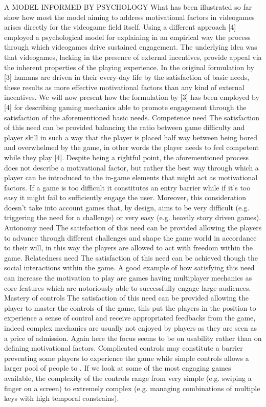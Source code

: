 A MODEL INFORMED BY PSYCHOLOGY
What has been illustrated so far show how most the model aiming to address motivational factors in videogames arises directly for the videogame field itself. Using a different approach [4] employed a psychological model for explaining in an empirical way the process through which videogames drive sustained engagement. The underlying idea was that videogames, lacking in the presence of external incentives, provide appeal via the inherent properties of the playing experience. In the original formulation by [3] humans are driven in their every-day life by the satisfaction of basic needs, these results as more effective motivational factors than any kind of  external incentives. We will now present how the formulation by [3] has been employed by [4] for describing gaming mechanics able to promote engagement through the satisfaction of the aforementioned basic needs.
Competence need 
The satisfaction of this need can be provided balancing the ratio between game difficulty and player skill in such a way that the player is placed half way between being bored and overwhelmed by the game, in other words the player needs to feel competent while they play [4]. Despite being a rightful point, the aforementioned process does not describe a motivational factor, but rather the best way through which a player can be introduced to the in-game elements that might act as motivational factors. If a game is too difficult it constitutes an entry barrier while if it’s too easy it might fail to sufficiently engage the user. Moreover, this consideration doesn’t take into account games that, by design, aims to be very difficult (e.g. triggering the need for a challenge) or very easy (e.g. heavily story driven games).
Autonomy need 	
The satisfaction of this need can be provided allowing the players to advance through different challenges and shape the game world in accordance to their will, in this way the players are allowed to act with freedom within the game.
Relatedness need 
The satisfaction of this need can be achieved though the social interactions within the game. A good example of how satisfying this need can increase the motivation to play are games having multiplayer mechanics as core features which are notoriously able to successfully engage large audiences. 
Mastery of controls
The satisfaction of this need can be provided allowing the player to master the controls of the game, this put the players in the position to experience a sense of control and receive appropriated feedbacks from the game, indeed complex mechanics are usually not enjoyed by players as they are seen as a price of admission. Again here the focus seems to be on usability rather than on defining motivational factors. Complicated controls may constitute a barrier preventing some players to experience the game while simple controls allows a larger pool of people to . If we look at some of the most engaging games available, the complexity of the controls range from very simple (e.g. swiping a finger on a screen) to extremely complex (e.g. managing combinations of multiple keys with high temporal constrains).
